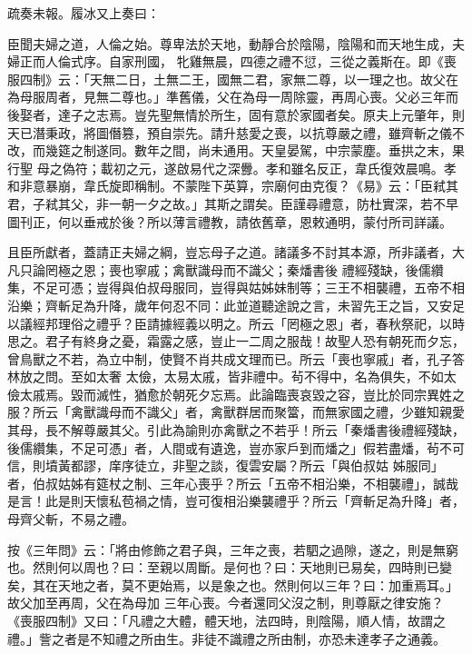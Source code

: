 \begin{pinyinscope}
 疏奏未報。履冰又上奏曰：



 臣聞夫婦之道，人倫之始。尊卑法於天地，動靜合於陰陽，陰陽和而天地生成，夫婦正而人倫式序。自家刑國，
 牝雞無晨，四德之禮不愆，三從之義斯在。即《喪服四制》云：「天無二日，土無二王，國無二君，家無二尊，以一理之也。故父在為母服周者，見無二尊也。」準舊儀，父在為母一周除靈，再周心喪。父必三年而後娶者，達子之志焉。豈先聖無情於所生，固有意於家國者矣。原夫上元肇年，則天已潛秉政，將圖僭篡，預自崇先。請升慈愛之喪，以抗尊嚴之禮，雖齊斬之儀不改，而幾筵之制遂同。數年之間，尚未通用。天皇晏駕，中宗蒙塵。垂拱之末，果行聖
 母之偽符；載初之元，遂啟易代之深釁。孝和雖名反正，韋氏復效晨鳴。孝和非意暴崩，韋氏旋即稱制。不蒙陛下英算，宗廟何由克復？《易》云：「臣弒其君，子弒其父，非一朝一夕之故。」其斯之謂矣。臣謹尋禮意，防杜實深，若不早圖刊正，何以垂戒於後？所以薄言禮教，請依舊章，恩敕通明，蒙付所司詳議。



 且臣所獻者，蓋請正夫婦之綱，豈忘母子之道。諸議多不討其本源，所非議者，大凡只論罔極之恩；喪也寧戚；禽獸識母而不識父；秦燔書後
 禮經殘缺，後儒纘集，不足可憑；豈得與伯叔母服同，豈得與姑姊妹制等；三王不相襲禮，五帝不相沿樂；齊斬足為升降，歲年何忍不同：此並道聽途說之言，未習先王之旨，又安足以議經邦理俗之禮乎？臣請據經義以明之。所云「罔極之恩」者，春秋祭祀，以時思之。君子有終身之憂，霜露之感，豈止一二周之服哉！故聖人恐有朝死而夕忘，曾鳥獸之不若，為立中制，使賢不肖共成文理而已。所云「喪也寧戚」者，孔子答林放之問。至如太奢
 太儉，太易太戚，皆非禮中。茍不得中，名為俱失，不如太儉太戚焉。毀而滅性，猶愈於朝死夕忘焉。此論臨喪哀毀之容，豈比於同宗異姓之服？所云「禽獸識母而不識父」者，禽獸群居而聚簹，而無家國之禮，少雖知親愛其母，長不解尊嚴其父。引此為諭則亦禽獸之不若乎！所云「秦燔書後禮經殘缺，後儒纘集，不足可憑」者，人間或有遺逸，豈亦家戶到而燔之」假若盡燔，茍不可信，則墳黃都謬，庠序徒立，非聖之談，復雲安屬？所云「與伯叔姑
 姊服同」者，伯叔姑姊有筵杖之制、三年心喪乎？所云「五帝不相沿樂，不相襲禮」，誠哉是言！此是則天懷私苞禍之情，豈可復相沿樂襲禮乎？所云「齊斬足為升降」者，母齊父斬，不易之禮。



 按《三年問》云：「將由修飾之君子與，三年之喪，若駟之過隙，遂之，則是無窮也。然則何以周也？曰：至親以周斷。是何也？曰：天地則已易矣，四時則已變矣，其在天地之者，莫不更始焉，以是象之也。然則何以三年？曰：加重焉耳。」故父加至再周，父在為母加
 三年心喪。今者還同父沒之制，則尊厭之律安施？《喪服四制》又曰：「凡禮之大體，體天地，法四時，則陰陽，順人情，故謂之禮。」訾之者是不知禮之所由生。非徒不識禮之所由制，亦恐未達孝子之通義。




\end{pinyinscope}
